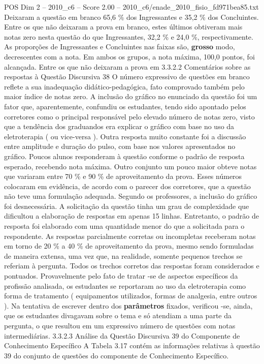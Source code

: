 \begin{textsample}{POS Dim 2 – 2010\_c6 – Score 2.00 – 2010\_c6/enade\_2010\_fisio\_fd971bea85.txt}
Deixaram a questão em branco 65,6 \% dos Ingressantes e 35,2 \% dos Concluintes.
Entre os que não deixaram a prova em branco, estes últimos obtiveram mais notas zero nesta questão do que Ingressantes, 32,2 \% e 24,0 \%, respectivamente.
As proporções de Ingressantes e Concluintes nas faixas são, \textbf{grosso} modo, decrescentes com a nota.
Em ambos os grupos, a nota máxima, 100,0 pontos, foi alcançada.
Entre os que não deixaram a prova em 3.3.2.2 Comentários sobre as respostas à Questão Discursiva 38 O número expressivo de questões em branco reflete a sua inadequação didático-pedagógica, fato comprovado também pelo maior índice de notas zero.
A inclusão do gráfico no enunciado da questão foi um fator que, aparentemente, confundiu os estudantes, tendo sido apontado pelos corretores como o principal responsável pelo elevado número de notas zero, visto que a tendência dos graduandos era explicar o gráfico com base no uso da eletroterapia ( ou vice-versa ).
Outra resposta muito constante foi a discussão entre amplitude e duração do pulso, com base nos valores apresentados no gráfico.
Poucos alunos responderam à questão conforme o padrão de resposta esperado, recebendo nota máxima.
Outro conjunto um pouco maior obteve notas que variaram entre 70 \% e 90 \% de aproveitamento da prova.
Esses números colocaram em evidência, de acordo com o parecer dos corretores, que a questão não teve uma formulação adequada.
Segundo os professores, a inclusão do gráfico foi desnecessária.
A solicitação da questão tinha um grau de complexidade que dificultou a elaboração de respostas em apenas 15 linhas.
Entretanto, o padrão de resposta foi elaborado com uma quantidade menor do que a solicitada para o respondente.
As respostas parcialmente corretas ou incompletas receberam notas em torno de 20 \% a 40 \% de aproveitamento da prova, mesmo sendo formuladas de maneira extensa, uma vez que, na realidade, somente pequenos trechos se referiam à pergunta.
Todos os trechos corretos das respostas foram considerados e pontuados.
Provavelmente pelo fato de tratar -se de aspectos específicos da profissão analisada, os estudantes se reportaram ao uso da eletroterapia como forma de tratamento ( equipamentos utilizados, formas de analgesia, entre outros ).
Na tentativa de escrever dentro dos \textbf{parâmetros} fixados, verificou -se, ainda, que os estudantes divagavam sobre o tema e só atendiam a uma parte da pergunta, o que resultou em um expressivo número de questões com notas intermediárias. 3.3.2.3 Análise da Questão Discursiva 39 do Componente de Conhecimento Específico A Tabela 3.17 contém as informações relativas à questão 39 do conjunto de questões do componente de Conhecimento Específico.

\end{textsample}
